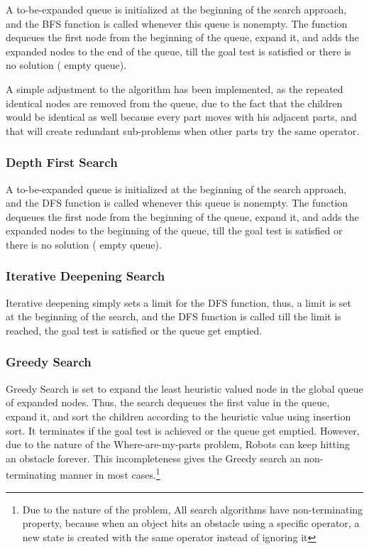 A to-be-expanded queue is initialized at the beginning of the search approach, and the BFS function is called whenever this queue is nonempty. The function dequeues the first node from the beginning of the queue, expand it, and adds the expanded nodes to the end of the queue, till the goal test is satisfied or there is no solution ( empty queue).

A simple adjustment to the algorithm has been implemented, as the repeated identical nodes are removed from the queue, due to the fact that the children would be identical as well because every part moves with his adjacent parts, and that will create redundant sub-problems when other parts try the same operator. 

\subsubsection{Depth First Search}

A to-be-expanded queue is initialized at the beginning of the search approach, and the DFS function is called whenever this queue is nonempty. The function dequeues the first node from the beginning of the queue, expand it, and adds the expanded nodes to the beginning of the queue, till the goal test is satisfied or there is no solution ( empty queue). 


\subsubsection{Iterative Deepening Search}

Iterative deepening simply sets a limit for the DFS function, thus, a limit is set at the beginning of the search, and the DFS function is called till the limit is reached, the goal test is satisfied or the queue get emptied.

\subsubsection{Greedy Search}
Greedy Search is set to expand the least heuristic valued node in the global queue of expanded nodes. Thus, the search dequeues the first value in the queue, expand it, and sort the children according to the heuristic value using insertion sort. It terminates if the goal test is achieved or the queue get emptied. However, due to the nature of the Where-are-my-parts problem, Robots can keep hitting an obstacle forever. This incompleteness gives the Greedy search an non-terminating manner in most cases.\footnote{Due to the nature of the problem, All search algorithms have non-terminating property, because when an object hits an obstacle using a specific operator, a new state is created with the same operator instead of ignoring it}


